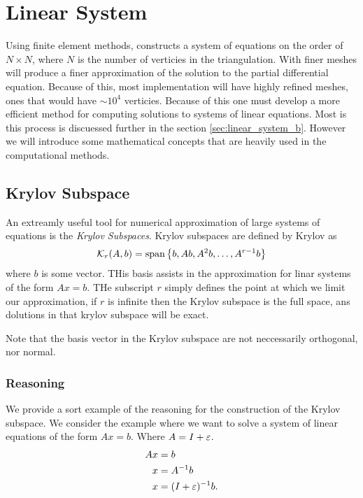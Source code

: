 \documentclass[../fem.tex]{subfile}
\begin{document}
\section{Linear System}%
\label{sec:linear_system}

Using finite element methods, constructs a system of equations on the order of
$N\times N$, where $N$ is the number of verticies in the triangulation. With
finer meshes will produce a finer approximation of the solution to the partial
differential equation. Because of this, most implementation will have highly
refined meshes, ones that would have $\sim 10^4$ verticies. Because of this one
must develop a more efficient method for computing solutions to systems of
linear equations. Most is this process is discuessed further in the
section \ref{sec:linear_system_b}. However we will introduce some mathematical
concepts that are heavily used in the computational methods.

\subsection{Krylov Subspace}%
\label{sub:krylov_subspace}

An extreamly useful tool for numerical approximation of large systems of
equations is the \textit{Krylov Subspaces}. Krylov subspaces are defined by
Krylov \cite{KRYLOV} as
\begin{align*}
  \mathcal{K}_r(A,b)=\text{span}\left\{b,Ab,A^2b,\ldots,A^{r-1}b\right\}
\end{align*}
where $b$ is some vector. THis basis assists in the approximation for linar
systems of the form $Ax=b$. THe subscript $r$ simply defines the point at which
we limit our approximation, if $r$ is infinite then the Krylov subspace is the
full space, ans dolutions in that krylov subspace will be exact.

Note that the basis vector in the Krylov subspace are not neccessarily
orthogonal, nor normal.

\subsubsection{Reasoning}%
\label{ssub:reasoning}

We provide a sort example of the reasoning for the construction of the Krylov
subspace. We consider the example where we want to solve a system of linear
equations of the form $Ax=b$. Where $A=I+{\varepsilon}$.
\begin{align*}
  Ax&=b\\
  x&=A^{-1}b\\
  x&=(I+{\varepsilon})^{-1}b.
\end{align*}
\end{document}
